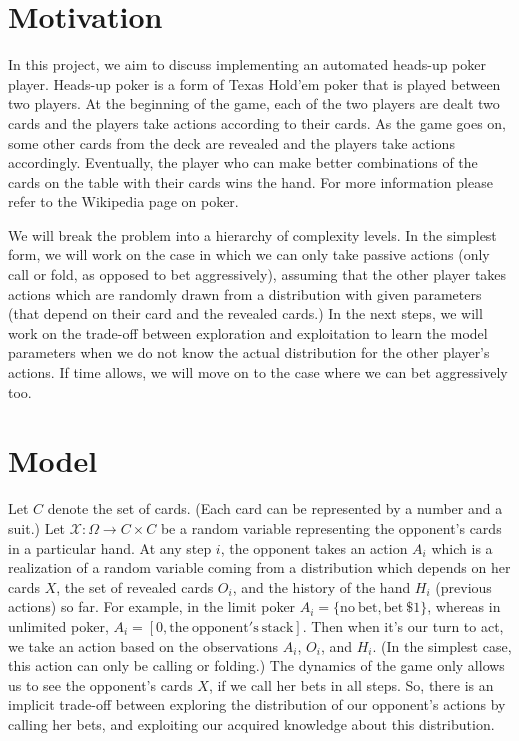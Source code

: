 \section{Motivation}\label{intro}
In this project, we aim to discuss implementing an automated heads-up poker 
player. Heads-up poker is a form of Texas Hold'em poker that is played 
between two players. At
the beginning of the game, each of the two players are dealt two cards and 
the players take actions according to their cards. As the game goes on, some
other cards from the deck are revealed and the players take actions 
accordingly. Eventually, the player who can make better combinations of
the cards on the table with their cards wins the hand. For more information
please refer to the Wikipedia page on poker.

We will break the problem into a hierarchy of complexity levels. In the simplest 
form, we will work on the case in which we can only take passive actions
(only call or fold, as opposed to bet aggressively), assuming that the other player takes actions
which are randomly drawn from a distribution with given parameters (that depend
on their card and the revealed cards.) In the next steps, we will work on the
trade-off between exploration and exploitation to learn the model parameters 
when we do not know the actual distribution for the other player's actions. 
If time allows, we will move on to the case where we can bet aggressively too.

\section{Model}
Let $C$ denote the set of cards. (Each card can be represented by a number
and a suit.) Let $\mathcal X:\Omega \rightarrow C\times C $ be a random variable 
representing the opponent's cards in a particular hand. At any step $i$,
the opponent takes an action $A_i$ which is a realization of a random variable
coming from a distribution
which depends on her cards $X$, the set of revealed cards $O_i$, and the 
history of the hand $H_i$ (previous actions) so far. For example, in the limit poker 
$A_i=\{\mathrm{no~bet},\mathrm{bet~\$1}\}$, whereas in unlimited poker,
$A_i=[0,\mathrm{the~opponent's~stack}]$. Then when it's our turn to act, we take an 
action based on the observations $A_i$, $O_i$, and $H_i$. (In the simplest case, this 
action can only be calling or folding.) The dynamics of the game only allows
us to see the opponent's cards $X$, if we call her bets in all steps. So, there is
an implicit trade-off between exploring the distribution of our opponent's actions
by calling her bets, and exploiting our acquired knowledge about this distribution.

